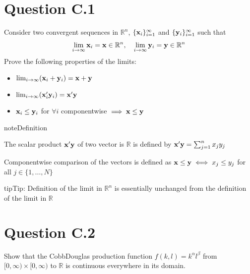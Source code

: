 \documentclass[letterpaper,10pt,english]{jupyterBook}
\begin{document}
\section{Question C.1}
\label{\detokenize{04.exercises:question-c-1}}
\sphinxAtStartPar
Consider two convergent sequences in \(\mathbb{R}^n\), \(\{{\bf x}_i\}_{i=1}^\infty\) and
\(\{{\bf y}_i\}_{i=1}^\infty\) such that
\begin{equation*}
\begin{split}
\lim_{i \to \infty} {\bf x}_i = {\bf x} \in \mathbb{R}^n, \quad
\lim_{i \to \infty} {\bf y}_i = {\bf y} \in \mathbb{R}^n
\end{split}
\end{equation*}
\sphinxAtStartPar
Prove the following properties of the limits:
\begin{itemize}
\item {} 
\sphinxAtStartPar
\(\lim_{i \to \infty} ({\bf x}_i+{\bf y}_i) = {\bf x} + {\bf y}\)

\item {} 
\sphinxAtStartPar
\(\lim_{i \to \infty} ({\bf x}_i'{\bf y}_i) = {\bf x}'{\bf y}\)

\item {} 
\sphinxAtStartPar
\({\bf x}_i \le {\bf y}_i\) for \(\forall i\) component\sphinxhyphen{}wise \(\implies {\bf x} \le {\bf y}\)

\end{itemize}

\begin{sphinxadmonition}{note}{Definition}

\sphinxAtStartPar
The scalar product \({\bf x}'{\bf y}\) of two vector is \(\mathbb{R}\) is defined by \({\bf x}'{\bf y} = \sum_{j=1}^n x_j y_j\)

\sphinxAtStartPar
Component\sphinxhyphen{}wise comparison of the vectors is defined as \({\bf x} \le {\bf y} \iff x_j \le y_j\) for all \(j\in\{1,\dots,N\}\)
\end{sphinxadmonition}

\begin{sphinxadmonition}{tip}{Tip:}
\sphinxAtStartPar
Definition of the limit in \(\mathbb{R}^n\) is essentially unchanged from the definition of the limit in \(\mathbb{R}\)
\end{sphinxadmonition}


\section{Question C.2}
\label{\detokenize{04.exercises:question-c-2}}
\sphinxAtStartPar
Show that the Cobb\sphinxhyphen{}Douglas production function
\(f(k,l) = k^\alpha l^\beta\) from \([0,\infty) \times [0,\infty)\) to \(\mathbb{R}\) is continuous everywhere in its domain.
\end{document}
